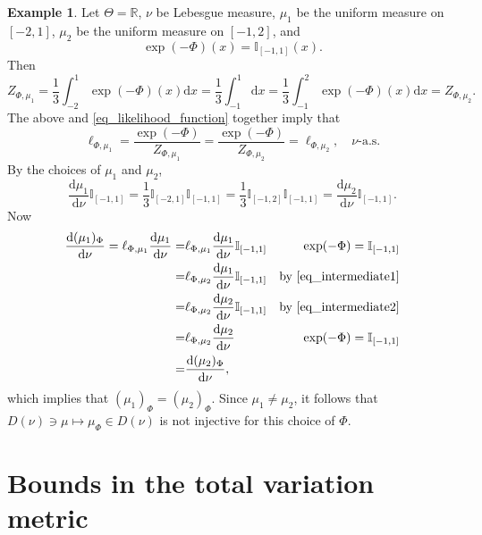 \documentclass[a4paper]{scrartcl}
\theoremstyle{definition}
\newtheorem{example}[theorem]{Example}
\numberwithin{equation}{section}
\newcommand{\R}{\mathbb{R}}
\newcommand{\rd}{\mathrm{d}}
\begin{document}
\begin{example}
 \label{example_prior_to_posterior_noninjective}
  Let $\Theta=\R$, $\nu$ be Lebesgue measure, $\mu_1$ be the uniform measure on $[-2,1]$, $\mu_2$ be the uniform measure on $[-1,2]$, and 
  \begin{equation*}
   \exp(-\Phi)(x)=\mathbb{I}_{[-1,1]}(x).
  \end{equation*}
Then
\begin{equation*}
 Z_{\Phi,\mu_1}=\frac{1}{3}\int_{-2}^{1}\exp(-\Phi)(x)\rd x=\frac{1}{3}\int_{-1}^{1}\rd x=\frac{1}{3}\int_{-1}^{2}\exp(-\Phi)(x)\rd x=Z_{\Phi,\mu_2}.
\end{equation*}
The above and \eqref{eq_likelihood_function} together imply that 
\begin{equation}
\label{eq_intermediate1}
 \ell_{\Phi,\mu_1}=\frac{\exp(-\Phi)}{Z_{\Phi,\mu_1}}=\frac{\exp(-\Phi)}{Z_{\Phi,\mu_2}}=\ell_{\Phi,\mu_2},\quad \text{$\nu$-a.s.}
\end{equation}
By the choices of $\mu_1$ and $\mu_2$,
\begin{equation}
\label{eq_intermediate2}
\frac{\rd\mu_1}{\rd\nu}\mathbb{I}_{[-1,1]}=\frac{1}{3}\mathbb{I}_{[-2,1]}\mathbb{I}_{[-1,1]} =\frac{1}{3}\mathbb{I}_{[-1,2]}\mathbb{I}_{[-1,1]} =\frac{\rd\mu_2}{\rd\nu}\mathbb{I}_{[-1,1]}.
\end{equation}
Now
\begin{align*}
 \frac{\rd(\mu_1)_\Phi}{\rd\nu}=\ell_{\Phi,\mu_1}\frac{\rd\mu_1}{\rd\nu}=& \ell_{\Phi,\mu_1}\frac{\rd\mu_1}{\rd\nu}\mathbb{I}_{[-1,1]} & \exp(-\Phi)=\mathbb{I}_{[-1,1]}
 \\
 =&\ell_{\Phi,\mu_2}\frac{\rd\mu_1}{\rd\nu}\mathbb{I}_{[-1,1]} & \text{by \eqref{eq_intermediate1}}
 \\
 =& \ell_{\Phi,\mu_2}\frac{\rd\mu_2}{\rd\nu}\mathbb{I}_{[-1,1]} & \text{by \eqref{eq_intermediate2}}
 \\
 =& \ell_{\Phi,\mu_2}\frac{\rd\mu_2}{\rd\nu} & \exp(-\Phi)=\mathbb{I}_{[-1,1]}
 \\
 =&\frac{\rd(\mu_2)_\Phi}{\rd\nu},
\end{align*}
which implies that $(\mu_1)_\Phi=(\mu_2)_\Phi$. Since $\mu_1\neq \mu_2$, it follows that $D(\nu)\ni \mu\mapsto \mu_\Phi\in D(\nu)$ is not injective for this choice of $\Phi$.
\end{example}

\section{Bounds in the total variation metric}
\label{sectionTVbounds}
\end{document}
